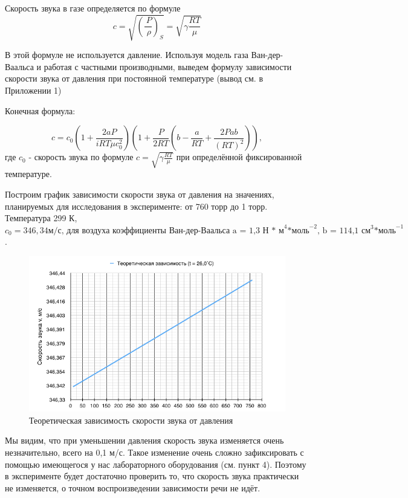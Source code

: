\documentclass[a4paper,12pt]{article}
\begin{document}
Скорость звука в газе определяется по формуле
\begin{equation}
    c = \sqrt{\left ( \frac{\ P}{\ \rho}\right )_S} = \sqrt{\gamma \frac{RT}{\mu}}
\end{equation}

В этой формуле не используется давление. Используя модель газа Ван-дер-Ваальса и работая с частными производными, выведем формулу зависимости скорости звука от давления при постоянной температуре (вывод см. в Приложении 1)

Конечная формула: 

\begin{equation}
c = c_0 \left ( 1 + \frac{2aP}{iRT\mu c^2_0} \right )\left ( 1 + \frac{P}{2RT} \left ( b - \frac{a}{RT} + \frac{2Pab}{(RT)^2} \right ) \right ),
\end{equation}
где $c_0$ - скорость звука по формуле $c = \sqrt{\gamma \frac{RT}{\mu}}$ при определённой фиксированной температуре. 

Построим график зависимости скорости звука от давления на значениях, планируемых для исследования в эксперименте: от 760 торр до 1 торр. Температура 299 К, $c_0 = 346,34 \text{м/с, для воздуха коэффициенты Ван-дер-Ваальса a = 1,3 Н * м}^4 \text{*моль}^{-2} \text{, b = 114,1 см}^3 \text{*моль}^{-1}$.

\begin{figure}[h]
    \centering
    \includegraphics[width=\textwidth]{gr_Th.png}
    \caption{Теоретическая зависимость скорости звука от давления}
    \label{t:final}
\end{figure}

Мы видим, что при уменьшении давления скорость звука изменяется очень незначительно, всего на 0,1 м/с. Такое изменение очень сложно зафиксировать с помощью имеющегося у нас лабораторного оборудования (см. пункт 4). Поэтому в эксперименте будет достаточно проверить то, что скорость звука практически не изменяется, о точном воспроизведении зависимости речи не идёт. \par 
\end{document}
